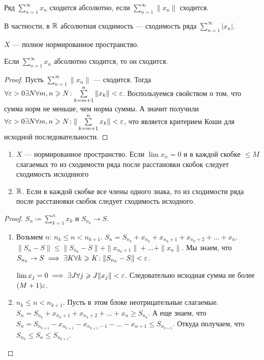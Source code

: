 \begin{definition}
    Ряд $\sum\limits_{n=1}^\infty x_n$ сходится абсолютно, если  $\sum\limits_{n=1}^\infty \|x_n\|$ сходится.
\end{definition}
\begin{remark}
    В частности, в $\mathbb{R}$ абсолютная сходимость --- сходимость ряда  $\sum\limits_{n=1}^\infty |x_n|$.
\end{remark}
\begin{theorem}
    $X$ --- полное нормированное пространство.

    Если  $\sum\limits_{n=1}^\infty x_n$ абсолютно сходится, то он сходится.
\end{theorem}
\begin{proof}
    Пусть $\sum\limits_{n=1}^\infty \|x_n\|$ --- сходится. Тогда  $\forall \varepsilon > 0 \exists N \forall m, n \geqslant N\!: \sum\limits_{k=m+1}^n \|x_k\| < \varepsilon$. Воспользуемся свойством о том, что сумма норм не меньше, чем норма суммы. А значит получили $\forall \varepsilon > 0 \exists N \forall m, n \geqslant N\!: \| \sum\limits_{k=m+1}^n x_k\| < \varepsilon$, что является критерием Коши для исходной последовательности.
\end{proof}
\begin{theorem}
    \begin{enumerate}
        \item $X$ --- нормированное пространство. Если  $\lim x_n = 0$ и в каждой скобке  $\le M$ слагаемых то из сходимости ряда после расстановки скобок следует сходимость исходнного
        \item $\mathbb{R}$. Если в каждой скобке все члены одного знака, то из сходимости ряда после расстановки скобок следует сходимость исходного.
    \end{enumerate}
\end{theorem}
\begin{proof}
    $S_n \coloneqq \sum\limits_{k=1}^n x_k$ и  $S_{n_k} \to S$.
     \begin{enumerate}
         \item Возьмем $n$:  $n_k \le n < n_{k+1}$. $S_n = S_{n_k} + x_{n_k} + x_{n_k + 1} + x_{n_k  + 2} + \ldots + x_n$. $\|S_n - S\| \le \|S_{n_k} - S\| + \|x_{n_k + 1}\| + \ldots + \|x_n\|$. Мы знаем, что $S_{n_k} \to S \implies \exists K \forall k \geqslant K\!: \|S_{n_k} - S\| < \varepsilon$.

             $\lim x_j = 0 \implies \exists J \forall j \geqslant J \|x_j\| < \varepsilon$. Следовательно исходная сумма не более $(M+1)\varepsilon$.
         \item  $n_k \le n < n_{k+1}$. Пусть в этом блоке неотрицательные слагаемые. $S_n = S_{n_k} + x_{n_k + 1} + x_{n_k + 2} + \ldots + x_n \ge S_{n_k}$. А еще знаем, что $S_n = S_{n_{k+1}} - x_{n_{k+1}} - x_{n_{k+1} - 1} - \ldots - x_{n+1} \le S_{n_{k+1}}$. Откуда получаем, что $S_{n_k} \le S_n \le S_{n_{k+1}}$.
    \end{enumerate}
\end{proof}
